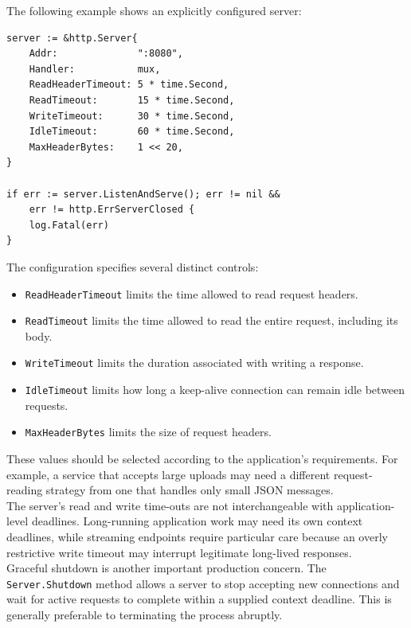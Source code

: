 The following example shows an explicitly configured server:

\begin{lstlisting}
server := &http.Server{
    Addr:              ":8080",
    Handler:           mux,
    ReadHeaderTimeout: 5 * time.Second,
    ReadTimeout:       15 * time.Second,
    WriteTimeout:      30 * time.Second,
    IdleTimeout:       60 * time.Second,
    MaxHeaderBytes:    1 << 20,
}

if err := server.ListenAndServe(); err != nil &&
    err != http.ErrServerClosed {
    log.Fatal(err)
}
\end{lstlisting}

The configuration specifies several distinct controls:

\begin{itemize}
    \item \texttt{ReadHeaderTimeout} limits the time allowed to read request headers.
    \item \texttt{ReadTimeout} limits the time allowed to read the entire request, including its body.
    \item \texttt{WriteTimeout} limits the duration associated with writing a response.
    \item \texttt{IdleTimeout} limits how long a keep-alive connection can remain idle between requests.
    \item \texttt{MaxHeaderBytes} limits the size of request headers.
\end{itemize}

These values should be selected according to the application's requirements. For example, a service that accepts large uploads may need a different request-reading strategy from one that handles only small JSON messages.\\

The server's read and write time-outs are not interchangeable with application-level deadlines. Long-running application work may need its own context deadlines, while streaming endpoints require particular care because an overly restrictive write timeout may interrupt legitimate long-lived responses.\\

Graceful shutdown is another important production concern. The \texttt{Server.Shutdown} method allows a server to stop accepting new connections and wait for active requests to complete within a supplied context deadline. This is generally preferable to terminating the process abruptly.

